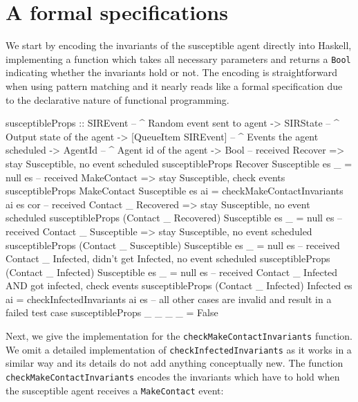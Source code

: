 \section{A formal specifications}
\label{sec:method}

We start by encoding the invariants of the susceptible agent directly into Haskell, implementing a function which takes all necessary parameters and returns a \texttt{Bool} indicating whether the invariants hold or not. The encoding is straightforward when using pattern matching and it nearly reads like a formal specification due to the declarative nature of functional programming.

\begin{HaskellCode}
susceptibleProps :: SIREvent              -- ^ Random event sent to agent
                 -> SIRState              -- ^ Output state of the agent
                 -> [QueueItem SIREvent]  -- ^ Events the agent scheduled
                 -> AgentId               -- ^ Agent id of the agent
                 -> Bool
-- received Recover => stay Susceptible, no event scheduled
susceptibleProps Recover Susceptible es _ = null es
-- received MakeContact => stay Susceptible, check events
susceptibleProps MakeContact Susceptible es ai
  = checkMakeContactInvariants ai es cor 
-- received Contact _ Recovered => stay Susceptible, no event scheduled
susceptibleProps (Contact _ Recovered) Susceptible es _ = null es
-- received Contact _ Susceptible => stay Susceptible, no event scheduled
susceptibleProps (Contact _ Susceptible) Susceptible es _  = null es
-- received Contact _ Infected, didn't get Infected, no event scheduled
susceptibleProps (Contact _ Infected) Susceptible es _ = null es
-- received Contact _ Infected AND got infected, check events
susceptibleProps (Contact _ Infected) Infected es ai
  = checkInfectedInvariants ai es
-- all other cases are invalid and result in a failed test case
susceptibleProps _ _ _ _ = False
\end{HaskellCode}

Next, we give the implementation for the \texttt{checkMakeContactInvariants} function. We omit a detailed implementation of \texttt{checkInfectedInvariants} as it works in a similar way and its details do not add anything conceptually new. The function \texttt{checkMakeContactInvariants} encodes the invariants which have to hold when the susceptible agent receives a \texttt{MakeContact} event:

